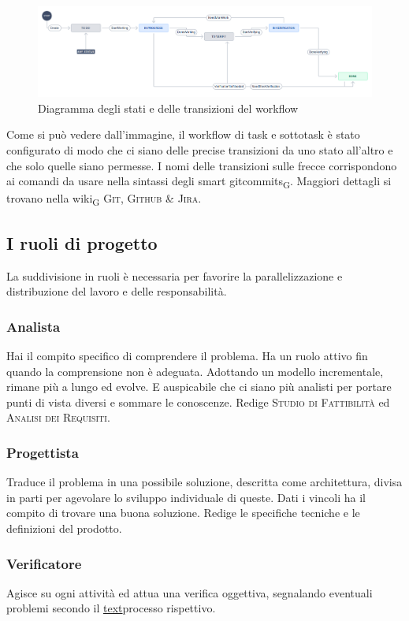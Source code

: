         \begin{figure}[H]
            \centering
            \includegraphics[scale=0.32]{res/images/jira_workflow.png}
            \caption{Diagramma degli stati e delle transizioni del workflow}
        \end{figure}
            Come si può vedere dall'immagine, il workflow di task e sottotask è stato configurato di modo che ci siano delle precise transizioni da uno stato all'altro e che solo quelle siano permesse. I nomi delle transizioni sulle frecce corrispondono ai comandi da usare nella sintassi degli smart \glspl{gitcommit}\textsubscript{G}. Maggiori dettagli si trovano nella \gls{wiki}\textsubscript{G} \textsc{Git, Github \& Jira}.

\subsection{I ruoli di progetto}
    La suddivisione in ruoli è necessaria per favorire la parallelizzazione e distribuzione del lavoro e delle responsabilità.
    \subsubsection{Analista}
    Hai il compito specifico di comprendere il problema. Ha un ruolo attivo fin quando la comprensione non è adeguata. Adottando un modello incrementale, rimane più a lungo ed evolve. E auspicabile che ci siano più analisti per portare punti di vista diversi e sommare le conoscenze. Redige \textsc{Studio di Fattibilità} ed \textsc{Analisi dei Requisiti}.
    \subsubsection{Progettista}
    Traduce il problema in una possibile soluzione, descritta come architettura, divisa in parti per agevolare lo sviluppo individuale di queste. Dati i vincoli ha il compito di trovare una buona soluzione. Redige le specifiche tecniche e le definizioni del prodotto.
    \subsubsection{Verificatore}
    Agisce su ogni attività ed attua una verifica oggettiva, segnalando eventuali problemi secondo il \hyperref[label]{text}{processo rispettivo}.
